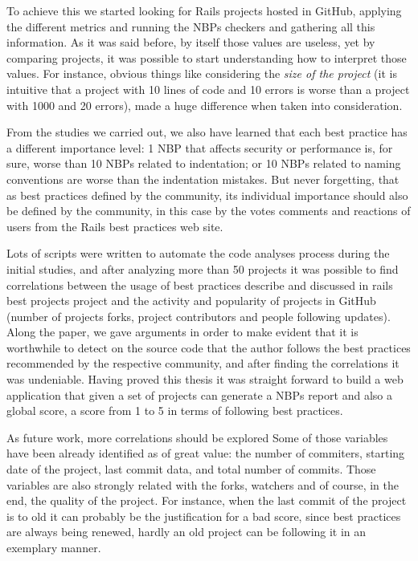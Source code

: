 To achieve this we started looking for Rails projects hosted in GitHub, 
applying the different metrics and running the NBPs checkers and gathering all this information.
As it was said before, by itself those values are useless, yet
by comparing projects, it was possible to start understanding how to interpret those values.
For instance, obvious things like considering the \emph{size of the project}
(it is intuitive that a project with 10 lines of code and 10 errors is worse than a project with 1000 and 20 errors),
made a huge difference when taken into consideration.

From the studies we carried out,
we also have learned that each best practice has a different importance level:
1 NBP that affects security or performance is, for sure, worse than 10 NBPs related to indentation;
or 10 NBPs related to naming conventions are worse than the indentation mistakes.
But never forgetting, that as best practices defined by the community, 
its individual importance should also be defined by the community,
in this case by the votes comments and reactions of users from the Rails best practices web site.

Lots of scripts were written to automate the code analyses process during the initial studies, 
and after analyzing more than 50 projects it was possible to find correlations
between the usage of best practices describe and discussed in rails best projects project and
the activity and popularity of projects in GitHub (number of projects forks, project contributors and people following updates).
Along the paper, we gave arguments in order to make evident that it is worthwhile to detect on the source code
that the author follows the best practices recommended by the respective community, 
and after finding the correlations it was undeniable.
Having proved this thesis it was straight forward to build a web application that 
given a set of projects can generate a NBPs report and also a global score, 
a score from 1 to 5 in terms of following best practices.

As future work, more correlations should be explored
Some of those variables have been already identified as of great value: the number of commiters, starting date of the project, last commit data, and total number of commits. 
Those variables are also strongly related with the forks, watchers and of course, in the end, the quality of the project.
For instance, when the last commit of the project is to old it can probably be the justification for a bad score, 
since best practices are always being renewed, hardly an old project can be following it in an exemplary manner.


